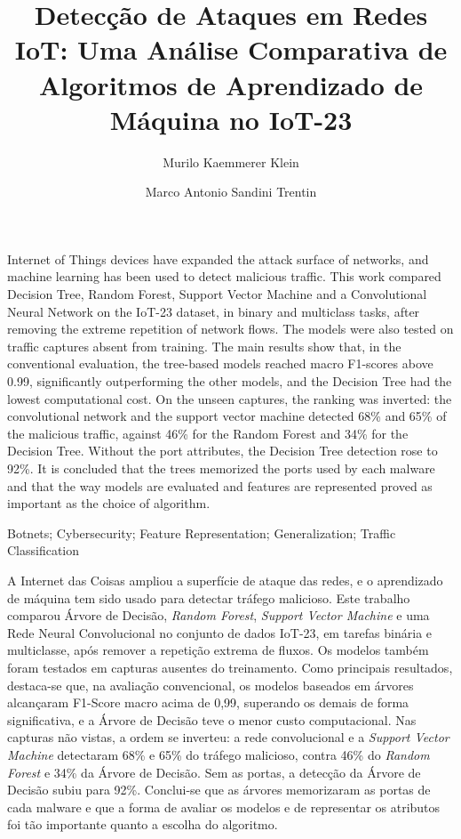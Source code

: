\documentclass[alpha-refs,brazilian]{CC-EC_TF-TC}
\title{Detecção de Ataques em Redes IoT: Uma Análise Comparativa de Algoritmos de Aprendizado de Máquina no IoT-23}
\author[1]{Murilo Kaemmerer Klein}
\author[1]{Marco Antonio Sandini Trentin}
\affil[1]{Universidade de Passo Fundo, Instituto de Tecnologia, Curso de Ciência da Computação}
\begin{document}
\begin{frontmatter}

\maketitle
\thispagestyle{empty}

\begin{Abstract}
Internet of Things devices have expanded the attack surface of networks, and machine learning has been used to detect malicious traffic. This work compared Decision Tree, Random Forest, Support Vector Machine and a Convolutional Neural Network on the IoT-23 dataset, in binary and multiclass tasks, after removing the extreme repetition of network flows. The models were also tested on traffic captures absent from training. The main results show that, in the conventional evaluation, the tree-based models reached macro F1-scores above 0.99, significantly outperforming the other models, and the Decision Tree had the lowest computational cost. On the unseen captures, the ranking was inverted: the convolutional network and the support vector machine detected 68\% and 65\% of the malicious traffic, against 46\% for the Random Forest and 34\% for the Decision Tree. Without the port attributes, the Decision Tree detection rose to 92\%. It is concluded that the trees memorized the ports used by each malware and that the way models are evaluated and features are represented proved as important as the choice of algorithm.
\end{Abstract}

\begin{keywords}
Botnets; Cybersecurity; Feature Representation; Generalization; Traffic Classification
\end{keywords}

\begin{resumo}
A Internet das Coisas ampliou a superfície de ataque das redes, e o aprendizado de máquina tem sido usado para detectar tráfego malicioso. Este trabalho comparou Árvore de Decisão, \textit{Random Forest}, \textit{Support Vector Machine} e uma Rede Neural Convolucional no conjunto de dados IoT-23, em tarefas binária e multiclasse, após remover a repetição extrema de fluxos. Os modelos também foram testados em capturas ausentes do treinamento. Como principais resultados, destaca-se que, na avaliação convencional, os modelos baseados em árvores alcançaram F1-Score macro acima de 0,99, superando os demais de forma significativa, e a Árvore de Decisão teve o menor custo computacional. Nas capturas não vistas, a ordem se inverteu: a rede convolucional e a \textit{Support Vector Machine} detectaram 68\% e 65\% do tráfego malicioso, contra 46\% do \textit{Random Forest} e 34\% da Árvore de Decisão. Sem as portas, a detecção da Árvore de Decisão subiu para 92\%. Conclui-se que as árvores memorizaram as portas de cada malware e que a forma de avaliar os modelos e de representar os atributos foi tão importante quanto a escolha do algoritmo.
\end{resumo}


\end{frontmatter}
\end{document}
